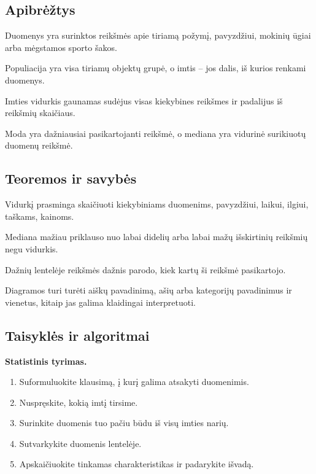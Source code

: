 \subsection{Apibrėžtys}
\begin{apibreztis}
Duomenys yra surinktos reikšmės apie tiriamą požymį, pavyzdžiui, mokinių ūgiai arba mėgstamos sporto šakos.
\end{apibreztis}
\begin{apibreztis}
Populiacija yra visa tiriamų objektų grupė, o imtis -- jos dalis, iš kurios renkami duomenys.
\end{apibreztis}
\begin{apibreztis}
Imties vidurkis gaunamas sudėjus visas kiekybines reikšmes ir padalijus iš reikšmių skaičiaus.
\end{apibreztis}
\begin{apibreztis}
Moda yra dažniausiai pasikartojanti reikšmė, o mediana yra vidurinė surikiuotų duomenų reikšmė.
\end{apibreztis}

\subsection{Teoremos ir savybės}
\begin{savybe}
Vidurkį prasminga skaičiuoti kiekybiniams duomenims, pavyzdžiui, laikui, ilgiui, taškams, kainoms.
\end{savybe}
\begin{savybe}
Mediana mažiau priklauso nuo labai didelių arba labai mažų išskirtinių reikšmių negu vidurkis.
\end{savybe}
\begin{savybe}
Dažnių lentelėje reikšmės dažnis parodo, kiek kartų ši reikšmė pasikartojo.
\end{savybe}
\begin{savybe}
Diagramos turi turėti aiškų pavadinimą, ašių arba kategorijų pavadinimus ir vienetus, kitaip jas galima klaidingai interpretuoti.
\end{savybe}

\subsection{Taisyklės ir algoritmai}
\textbf{Statistinis tyrimas.}
\begin{enumerate}[label=\arabic*.]
\item Suformuluokite klausimą, į kurį galima atsakyti duomenimis.
\item Nuspręskite, kokią imtį tirsime.
\item Surinkite duomenis tuo pačiu būdu iš visų imties narių.
\item Sutvarkykite duomenis lentelėje.
\item Apskaičiuokite tinkamas charakteristikas ir padarykite išvadą.
\end{enumerate}

